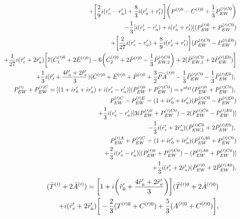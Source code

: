 \documentclass[aps,preprint,floats,epsf,epsfig,nofootinbib,letter]{revtex4}
\newcommand{\be}{\begin{eqnarray}}
\newcommand{\en}{\end{eqnarray}}
\newcommand{\non}{{\nonumber}}
\begin{document}
\begin{eqnarray}
\non\\
&&\qquad
+\bigg[\frac{2}{9} i(r'_e-r'_a)+\frac{8}{3} i(r'_a+r'_t) \bigg]
\bigg(P^{(\prime)0} - C^{(\prime)0} + \frac{1}{3} P_{EW}^{(\prime)C0}\bigg) 
\non\\
&&\qquad
-\frac{1}{3} [i(r'_e-r'_a)+i(r'_a+r'_t)] 
(P_{EW}^{(\prime)0} + P_{EW}^{(\prime)C0})
\non\\
&&\qquad
+\bigg[\frac{2}{27} i(r'_e-r'_a)+\frac{8}{9} i(r'_a+r'_t) \bigg]
(P_{EW}^{(\prime)C0} - P_{EW}^{(\prime)E0})
\non\\
&&\qquad
+\frac{1}{27} i(\bar r'_e+2\bar r'_a) \bigg[7 (\bar C_1^{(\prime)0} + 2 \bar E^{(\prime)0}) - 
   6 \bigg( \bar C_2^{(\prime)0} + 2\bar P^{(\prime)0} - \frac{1}{3} \bar P_{EW,2}^{(\prime)C0}\bigg)
   + 2 (\bar P_{EW,1}^{(\prime)C0} + 2 \bar P_{EW}^{(\prime)E0})\bigg]
\non\\   
&&\qquad
+\frac{1}{3}i(\hat r'_t +\frac{4\hat r'_a +2\hat r'_e}{3})
(\tilde C^{(\prime)0}+\tilde E^{(\prime)0}+\tilde P^{(\prime)0} +\frac{3}{2}\widetilde {PA}^{(\prime)0}-\frac{1}{3}\tilde P^{(\prime)C0}_{EW} -\frac{1}{3}\tilde P^{(\prime)E0}_{EW}),   
\non\\ 
&&P^{(\prime)}_{EW}+P^{(\prime)C}_{EW}
=[(1+ir'_0+ir'_a)+i(r'_e-r'_a)](P^{(\prime)0}_{EW}+P^{(\prime)C0}_{EW})=e^{i\delta_{27}}(P^{(\prime)0}_{EW}+P^{(\prime)C0}_{EW}),
\non\\
&&P_{EW}^{(\prime)C}-P_{EW}^{(\prime)E}
=(1+ir'_0+ir'_a)(P_{EW}^{(\prime)C0}-P_{EW}^{(\prime)E0})
\non\\
&&\qquad\qquad\qquad\quad
+\frac{1}{3}i(r'_e-r'_a)[3(P_{EW}^{(\prime)0}+P_{EW}^{(\prime)C0})
-2(P_{EW}^{(\prime)C0}-P_{EW}^{(\prime)E0})]
\non\\
&&\qquad\qquad\qquad\quad
-\frac{1}{3}i(\bar r'_e+2\bar r'_a)(\bar P_{EW,1}^{(\prime)C0}+2\bar P_{EW}^{(\prime)E0}),
\non\\
&&P_{EW}^{(\prime)A}+P_{EW}^{(\prime)C}
=(1+ir'_0+ir'_a)(P_{EW}^{(\prime)A0}+P_{EW}^{(\prime)C0})
\non\\
&&\qquad\qquad\qquad\quad
+\frac{2}{3}i(r'_e-r'_a)[(P_{EW}^{(\prime)0}+P_{EW}^{(\prime)C0})-(P_{EW}^{(\prime)A0}+P_{EW}^{(\prime)C0})]
\non\\
&&\qquad\qquad\qquad\quad
+\frac{1}{3}i(\bar r'_e+2\bar r'_a)(\bar P_{EW}^{(\prime)0}+2\bar P_{EW}^{(\prime)A0}),
\label{eq: rcombinations1}
\en
\be
&&(\bar T^{(\prime)}+2\bar A^{(\prime)})
=
\bigg[1+i\bigg(\tilde r'_0 +\frac{4\tilde r'_a +2\tilde r'_e}{3}\bigg)\bigg](\bar T^{(\prime)0}+2\bar A^{(\prime)0})
\non\\
&&\qquad\qquad\qquad\quad
+i(\bar r'_e+2\bar r'_a) \bigg[-\frac{2}{3}(T^{(\prime)0}+C^{(\prime)0})+\frac{5}{3} (A^{(\prime)0}+C^{(\prime)0})\bigg],

\end{eqnarray}
\end{document}
